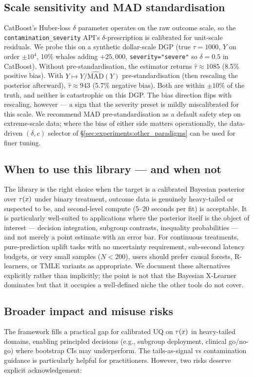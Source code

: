 \subsection{Scale sensitivity and MAD standardisation}
\label{sec:discussion:scale}
CatBoost's Huber-loss $\delta$ parameter operates on the raw outcome
scale, so the \texttt{contamination\_severity} API's
$\delta$-prescription is calibrated for unit-scale residuals. We
probe this on a synthetic dollar-scale DGP (true $\tau = 1000$,
$Y$ on order $\pm 10^4$, 10\% whales adding $+25{,}000$,
\texttt{severity="severe"} so $\delta = 0.5$ in CatBoost). Without
pre-standardisation, the estimator returns
$\hat\tau \approx 1085$ (8.5\% positive bias). With
$Y \mapsto Y/\widehat{\mathrm{MAD}}(Y)$ pre-standardisation
(then rescaling the posterior afterward), $\hat\tau \approx 943$
(5.7\% negative bias). Both are within $\pm 10\%$ of the truth, and
neither is catastrophic on this DGP. The bias direction flips
with rescaling, however --- a sign that the severity preset is
mildly miscalibrated for this scale. We recommend MAD
pre-standardisation as a default safety step on extreme-scale data;
where the bias of either side matters operationally, the
data-driven $(\delta, c)$ selector of
\S\ref{sec:experiments:other_paradigms} can be used for finer
tuning.

\subsection{When to use this library --- and when not}
The library is the right choice when the target is a calibrated
Bayesian posterior over $\tau(x)$ under binary treatment, outcome data
is genuinely heavy-tailed or suspected to be, and second-level
compute (5--20 seconds per fit) is acceptable. It is particularly
well-suited to applications where the posterior itself is the object
of interest --- decision integration, subgroup contrasts, inequality
probabilities --- and not merely a point estimate with an error bar.
For continuous treatments, pure-prediction uplift tasks with no
uncertainty requirement, sub-second latency budgets, or very small
samples ($N < 200$), users should prefer causal forests, R-learners,
or TMLE variants as appropriate. We document these alternatives
explicitly rather than implicitly; the point is not that the
Bayesian X-Learner dominates but that it occupies a well-defined
niche the other tools do not cover.

\subsection{Broader impact and misuse risks}
\label{sec:discussion:risks}
The framework fills a practical gap for calibrated UQ on $\tau(x)$ in
heavy-tailed domains, enabling principled decisions (e.g., subgroup
deployment, clinical go/no-go) where bootstrap CIs may underperform.
The tails-as-signal vs contamination guidance is particularly
helpful for practitioners. However, two risks deserve explicit
acknowledgement:

